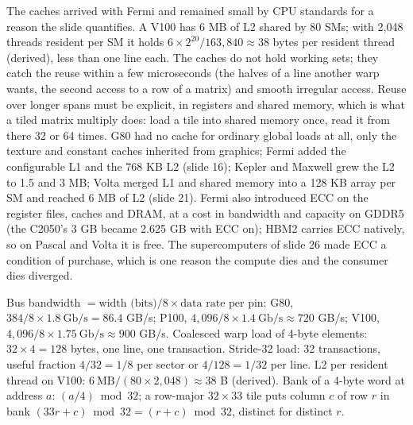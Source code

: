\documentclass[11pt,letterpaper]{article}
\newenvironment{formulas}{\begin{tcolorbox}[formulabox]}{\end{tcolorbox}}
\begin{document}
The caches arrived with Fermi and remained small by CPU standards for a reason the slide quantifies. A V100 has 6 MB of L2 shared by 80 SMs; with 2,048 threads resident per SM it holds $6 \times 2^{20} / 163{,}840 \approx 38$ bytes per resident thread (derived), less than one line each. The caches do not hold working sets; they catch the reuse within a few microseconds (the halves of a line another warp wants, the second access to a row of a matrix) and smooth irregular access. Reuse over longer spans must be explicit, in registers and shared memory, which is what a tiled matrix multiply does: load a tile into shared memory once, read it from there 32 or 64 times. G80 had no cache for ordinary global loads at all, only the texture and constant caches inherited from graphics; Fermi added the configurable L1 and the 768 KB L2 (slide 16); Kepler and Maxwell grew the L2 to 1.5 and 3 MB; Volta merged L1 and shared memory into a 128 KB array per SM and reached 6 MB of L2 (slide 21). Fermi also introduced ECC on the register files, caches and DRAM, at a cost in bandwidth and capacity on GDDR5 (the C2050's 3 GB became 2.625 GB with ECC on); HBM2 carries ECC natively, so on Pascal and Volta it is free. The supercomputers of slide 26 made ECC a condition of purchase, which is one reason the compute dies and the consumer dies diverged.

\begin{formulas}
Bus bandwidth $= \text{width (bits)} / 8 \times \text{data rate per pin}$: G80, $384/8 \times 1.8\ \text{Gb/s} = 86.4$ GB/s; P100, $4{,}096/8 \times 1.4\ \text{Gb/s} \approx 720$ GB/s; V100, $4{,}096/8 \times 1.75\ \text{Gb/s} \approx 900$ GB/s. Coalesced warp load of 4-byte elements: $32 \times 4 = 128$ bytes, one line, one transaction. Stride-32 load: 32 transactions, useful fraction $4/32 = 1/8$ per sector or $4/128 = 1/32$ per line. L2 per resident thread on V100: $6\ \text{MB} / (80 \times 2{,}048) \approx 38$ B (derived). Bank of a 4-byte word at address $a$: $(a/4) \bmod 32$; a row-major $32\times 33$ tile puts column $c$ of row $r$ in bank $(33r + c) \bmod 32 = (r + c) \bmod 32$, distinct for distinct $r$.
\end{formulas}
\end{document}
